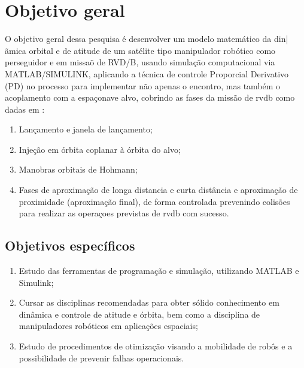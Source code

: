 \section{Objetivo geral}

O objetivo geral dessa pesquisa  é desenvolver um modelo matemático da din|ãmica orbital e de atitude de um satélite  tipo manipulador robótico como perseguidor e em missaõ de RVD/B, usando simulação computacional via MATLAB/SIMULINK, aplicando a técnica de controle Proporcial Derivativo (PD) no processo para implementar não apenas o encontro, mas também o acoplamento com a espaçonave alvo, cobrindo as fases da missão de \gls{rvdb} como dadas em \cite{fehse2003}:

\begin{enumerate}[label=(\roman*)]
    \item Lançamento e janela de lançamento;
    \item Injeção em órbita coplanar à órbita do alvo;
    \item Manobras orbitais de Hohmann;
    \item Fases de aproximação de longa distancia e curta distância e aproximação de proximidade (aproximação final), de forma controlada prevenindo colisões para realizar as operaçoes previstas de \gls{rvdb} com sucesso.
\end{enumerate}

\subsection{Objetivos específicos}

\begin{enumerate}[label=(\roman*)]
    \item Estudo das ferramentas de programação e simulação, utilizando MATLAB e Simulink;
    \item Cursar as disciplinas recomendadas para obter sólido conhecimento em dinâmica e controle de atitude e órbita, bem como a disciplina de manipuladores robóticos em aplicações espaciais;
    \item Estudo de procedimentos de otimização visando a mobilidade de robôs e a possibilidade de prevenir falhas operacionais.
\end{enumerate}